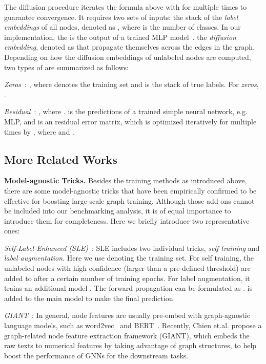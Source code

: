 \message{ !name(main.tex)}\documentclass{article}
\begin{document}
The diffusion procedure iterates the formula above with  for multiple times to guarantee convergence. It requires two sets of inputs:  the stack of the \textit{label embeddings} of all nodes, denoted as , where  is the number of classes. In our implementation, the  is the output of a trained MLP model~\cite{huang2020combining}.  the \textit{diffusion embedding}, denoted as  that propagate themselves across the edges in the graph. Depending on how the diffusion embeddings of unlabeled nodes are computed, two types of  are summarized as follows:



 \textit{Zeros}~\citep{zhu2005semi}:
, where  denotes the training set and  is the stack of true labels. For \textit{zeros}, .

 \textit{Residual}~\citep{huang2020combining}:
, where .  is the predictions of a trained simple neural network, e.g. MLP, and  is an residual error matrix, which is optimized iteratively for multiple times by , where  and .

\vspace{-2mm}
\subsection{More Related Works}
\vspace{-2mm}
\textbf{Model-agnostic Tricks.} Besides the training methods as introduced above, there are some model-agnostic tricks that have been empirically confirmed to be effective for boosting large-scale graph training. Although those add-ons cannot be included into our benchmarking analysis, it is of equal importance to introduce them for completeness. Here we briefly introduce two representative ones:

 \textit{Self-Label-Enhanced (SLE)}~\cite{sun2021scalable}: SLE includes two individual tricks, \textit{self training} and \textit{label augmentation}. Here we use  denoting the training set. For self training, the unlabeled nodes with high confidence (larger than a pre-defined threshold) are added to  after a certain number of training epochs. For label augmentation, it trains an additional model . The forward propagation can be formulated as .  is added to the main model to make the final prediction.

 \textit{GIANT}~\cite{chien2021node}: In general, node features are usually pre-embed with graph-agnostic language models, such as word2vec~\cite{mikolov2013distributed} and BERT~\cite{devlin2018bert}. Recently, Chien et.al. propose a graph-related node feature extraction framework (GIANT), which embeds the raw texts to numerical features by taking advantage of graph structures, to help boost the performance of GNNs for the downstream tasks.
\end{document}
